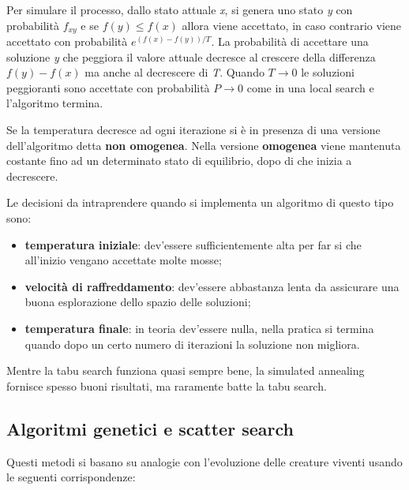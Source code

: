 \documentclass[11pt, oneside]{book}
\begin{document}
Per simulare il processo, dallo stato attuale {\em x}, si genera uno
stato {\em y} con probabilit\`a $f_{xy}$ e se $f(y) \leq f(x)$ allora
viene accettato, in caso contrario viene accettato con probabilit\`a
$e^{(f(x)-f(y))/T}$. La probabilit\`a di accettare una soluzione {\em
  y} che peggiora il valore attuale decresce al crescere della
differenza $f(y)-f(x)$ ma anche al decrescere di {\em T}. Quando $T
\rightarrow 0$ le soluzioni peggioranti sono accettate con
probabilit\`a $P \rightarrow 0$ come in una local search e l'algoritmo
termina.

\par\bigskip

Se la temperatura decresce ad ogni iterazione si \`e in presenza di
una versione dell'algoritmo detta {\bf non omogenea}. Nella versione
{\bf omogenea} viene mantenuta costante fino ad un determinato stato
di equilibrio, dopo di che inizia a decrescere.

\par\bigskip

Le decisioni da intraprendere quando si implementa un algoritmo di
questo tipo sono:

\begin{itemize}
  
\item {\bf temperatura iniziale}: dev'essere sufficientemente alta per
  far si che all'inizio vengano accettate molte mosse;

\item {\bf velocit\`a di raffreddamento}: dev'essere abbastanza lenta
  da assicurare una buona esplorazione dello spazio delle soluzioni;

\item {\bf temperatura finale}: in teoria dev'essere nulla, nella
  pratica si termina quando dopo un certo numero di iterazioni la
  soluzione non migliora.

\end{itemize}

Mentre la tabu search funziona quasi sempre bene, la simulated
annealing fornisce spesso buoni risultati, ma raramente batte la tabu
search.

\subsection{Algoritmi genetici e scatter search}

Questi metodi si basano su analogie con l'evoluzione delle creature
viventi usando le seguenti corrispondenze:
\end{document}

